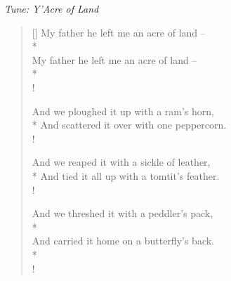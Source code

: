 \documentclass[MAIN]{subfiles}
\begin{document}
\begin{center}
\emph{Tune: Y'Acre of Land}
\end{center}

\bigskip

\settowidth{\versewidth}{And scattered it over with one peppercorn.}
\begin{verse}[\versewidth]
My father he left me an acre of land --\\*
\\
My father he left me an acre of land --\\*
\\!

And we ploughed it up with a ram's horn,\\*
And scattered it over with one peppercorn.\\!

And we reaped it with a sickle of leather,\\*
And tied it all up with a tomtit's feather.\\!

And we threshed it with a peddler's pack,\\*
\\
And carried it home on a butterfly's back.\\*
\\!
\end{verse}
\end{document}
